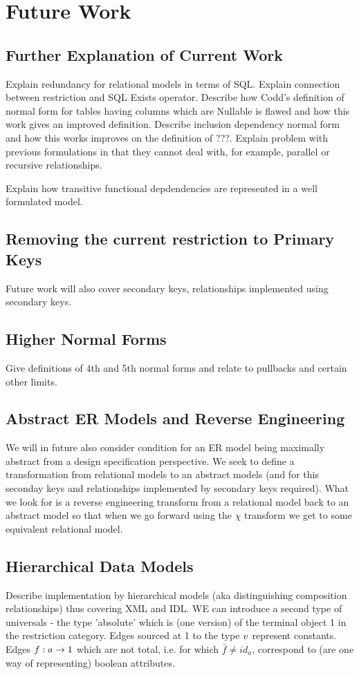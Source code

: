 \section{Future Work}
\subsection{Further Explanation of Current Work}
Explain redundancy for relational models in terms of SQL. 
Explain connection between restriction and SQL Exists operator.
Describe how Codd's definition of normal form for tables having columns which are Nullable is flawed and how this work gives an improved definition. 
Describe inclusion dependency normal form and how this works improves on the definition of ???. Explain problem with previous formulations
in that they cannot deal with, for example, parallel or recursive relationships. 

Explain how transitive functional depdendencies are represented in a well formulated model. 

\subsection{Removing the current restriction to Primary Keys}
Future work will also cover secondary keys, relationships implemented using secondary keys.

\subsection{Higher Normal Forms}
Give definitions of 4th and 5th normal forms and relate to pullbacks and certain other limits.  

\subsection {Abstract ER Models and Reverse Engineering}
We will in future also consider condition for an ER model being maximally abstract from a design specification perspective. We seek to define a transformation from relational models to an abstract models (and for this seconday keys and relationships implemented by secondary keys required). What we look for is a reverse engineering transform from a relational model back to an abstract model so that when we go forward using the $\chi$ transform we get to some equivalent relational model.

\subsection{Hierarchical Data Models}
Describe implementation by hierarchical models (aka distinguishing composition relationships) thus covering XML and IDL.
WE can introduce a second type of universals - the type 'absolute' which is (one version) of the terminal object 1 in the restriction
category. Edges sourced at 1 to the type $v$ represent constants. Edges $f: a \rightarrow 1$ which are not total, i.e. for which
$\bar{f} \neq id_a$, correspond to (are one way of representing) boolean attributes.  

